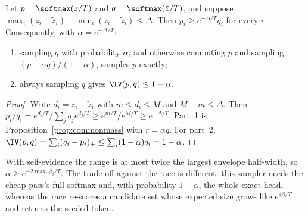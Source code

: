 \begin{proposition}\label{prop:boundedrange}
Let $p=\softmax(z/T)$ and $q=\softmax(\tilde z/T)$, and suppose $\max_i(z_i-\tilde z_i)-\min_i(z_i-\tilde z_i)\le\Delta$. Then $p_i\ge e^{-\Delta/T}q_i$ for every $i$. Consequently, with $\alpha=e^{-\Delta/T}$:
\begin{enumerate}
\item sampling $q$ with probability $\alpha$, and otherwise computing $p$ and sampling $(p-\alpha q)/(1-\alpha)$, samples $p$ exactly;
\item always sampling $q$ gives $\TV(p,q)\le1-\alpha$.
\end{enumerate}
\end{proposition}
\begin{proof}
Write $d_i=z_i-\tilde z_i$ with $m\le d_i\le M$ and $M-m\le\Delta$. Then $p_i/q_i=e^{d_i/T}/\sum_jq_je^{d_j/T}\ge e^{m/T}/e^{M/T}\ge e^{-\Delta/T}$. Part~1 is Proposition~\ref{prop:commonmass} with $r=\alpha q$. For part~2, $\TV(p,q)=\sum_i(q_i-p_i)_+\le\sum_i(1-\alpha)q_i=1-\alpha$.
\end{proof}
With self-evidence the range is at most twice the largest envelope half-width, so $\alpha\ge e^{-2\max_i\beta_i/T}$. The trade-off against the race is different: this sampler needs the cheap pass's full softmax and, with probability $1-\alpha$, the whole exact head, whereas the race re-scores a candidate set whose expected size grows like $e^{4\beta/T}$ and returns the seeded token.

